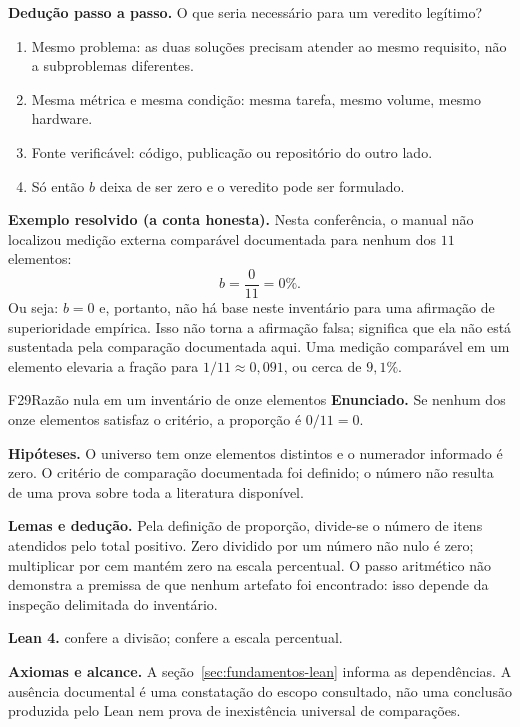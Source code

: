 \begin{metodo}
\textbf{Dedução passo a passo.} O que seria necessário para um veredito legítimo?
\begin{enumerate}[leftmargin=1.4em,itemsep=2pt]
  \item Mesmo problema: as duas soluções precisam atender ao mesmo requisito, não a subproblemas diferentes.
  \item Mesma métrica e mesma condição: mesma tarefa, mesmo volume, mesmo hardware.
  \item Fonte verificável: código, publicação ou repositório do outro lado.
  \item Só então $b$ deixa de ser zero e o veredito pode ser formulado.
\end{enumerate}
\end{metodo}

\begin{resultado}
\textbf{Exemplo resolvido (a conta honesta).} Nesta conferência, o manual não
localizou medição externa comparável documentada para nenhum dos $11$ elementos:
\[ b = \frac{0}{11} = 0\%. \]
Ou seja: $b = 0$ e, portanto, não há base neste inventário para uma afirmação de
superioridade empírica. Isso não torna a afirmação falsa; significa que ela não
está sustentada pela comparação documentada aqui. Uma medição comparável em um
elemento elevaria a fração para $1/11 \approx 0{,}091$, ou cerca de $9{,}1\%$.
\end{resultado}

\begin{formalizacao}{F29}{Razão nula em um inventário de onze elementos}
\textbf{Enunciado.} Se nenhum dos onze elementos satisfaz o critério, a proporção é $0/11=0$.

\textbf{Hipóteses.} O universo tem onze elementos distintos e o numerador informado é zero. O critério de comparação documentada foi definido; o número não resulta de uma prova sobre toda a literatura disponível.

\textbf{Lemas e dedução.} Pela definição de proporção, divide-se o número de itens atendidos pelo total positivo. Zero dividido por um número não nulo é zero; multiplicar por cem mantém zero na escala percentual. O passo aritmético não demonstra a premissa de que nenhum artefato foi encontrado: isso depende da inspeção delimitada do inventário.

\textbf{Lean 4.}  confere a divisão;  confere a escala percentual.

\textbf{Axiomas e alcance.} A seção~\ref{sec:fundamentos-lean} informa as dependências. A ausência documental é uma constatação do escopo consultado, não uma conclusão produzida pelo Lean nem prova de inexistência universal de comparações.
\end{formalizacao}


